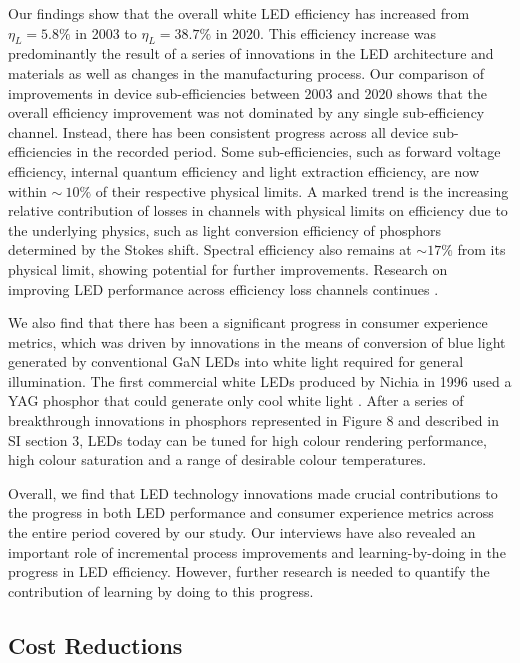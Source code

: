 \documentclass[twoside,twocolumn,9pt]{article}
\begin{document}
Our findings show that the overall white LED efficiency has increased from $\eta_L=5.8\%$ in 2003 to $\eta_L=38.7\%$ in 2020. This efficiency increase was predominantly the result of a series of innovations in the LED architecture and materials as well as changes in the manufacturing process. Our comparison of improvements in device sub-efficiencies between 2003 and 2020 shows that the overall efficiency improvement was not dominated by any single sub-efficiency channel. Instead, there has been consistent progress across all device sub-efficiencies in the recorded period. Some sub-efficiencies, such as forward voltage efficiency, internal quantum efficiency and light extraction efficiency, are now within $\sim~10\%$ of their respective physical limits. A marked trend is the increasing relative contribution of losses in channels with physical limits on efficiency due to the underlying physics, such as light conversion efficiency of phosphors determined by the Stokes shift. Spectral efficiency also remains at $\sim17\%$ from its physical limit, showing potential for further improvements. Research on improving LED performance across efficiency loss channels continues \cite{cho2017white}\cite{Weisbuch2020}.

We also find that there has been a significant progress in consumer experience metrics, which was driven by innovations in the means of conversion of blue light generated by conventional GaN LEDs into white light required for general illumination. The first commercial white LEDs produced by Nichia in 1996 used a YAG phosphor that could generate only cool white light \cite{BANDO1998}. After a series of breakthrough innovations in phosphors represented in Figure 8 and described in SI section 3, LEDs today can be tuned for high colour rendering performance, high colour saturation and a range of desirable colour temperatures. 

Overall, we find that LED technology innovations made crucial contributions to the progress in both LED performance and consumer experience metrics across the entire period covered by our study. Our interviews have also revealed an important role of incremental process improvements and learning-by-doing\cite{WRIGHT_1936}\cite{Arrow_1962} in the progress in LED efficiency. However, further research is needed to quantify the contribution of learning by doing to this progress.

\subsection{Cost Reductions}
\end{document}
